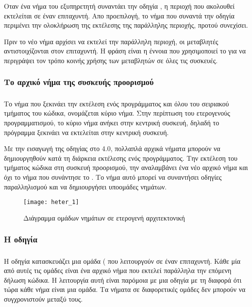 Οταν ένα νήμα του εξυπηρετητή συναντάει την οδηγία \emph{}, η περιοχή που ακολουθεί εκτελείται σε έναν επιταχυντή. Απο προεπιλογή, το νήμα που συναντά την οδηγία περιμένει την ολοκλήρωση της εκτέλεσης της παράλληλης περιοχής, προτού συνεχίσει.

Πριν το νέο νήμα αρχίσει να εκτελεί την παράλληλη περιοχή, οι μεταβλητές  \emph{} αντιστοιχίζονται στον επιταχυντή. Η φράση \emph{} είναι η έννοια που χρησιμοποιεί το \emph{} για να περιγράψει τον τρόπο κοινής χρήσης των μεταβλητών σε όλες τις συσκευές.



\subsubsection{Το αρχικό νήμα της συσκευής προορισμού}
\subparagraph{}
Το νήμα που ξεκινάει την εκτέλεση ενός προγράμματος και όλου του σειριακού τμήματος του κώδικα, ονομάζεται κύριο νήμα.
Στην περίπτωση του ετερογενούς προγραμματισμού, το κύριο νήμα ανήκει στην κεντρική συσκευή, δηλαδή το πρόγραμμα ξεκινάει να εκτελείται στην κεντρική συσκευή. 

Με την εισαγωγή της οδηγίας \emph{} στο \emph{} 4.0, πολλαπλά αρχικά νήματα μπορούν να δημιουργηθούν κατά τη διάρκεια εκτέλεσης ενός προγράμματος. Την εκτέλεση του τμήματος κώδικα στη συσκευή προορισμού, την αναλαμβάνει ένα νέο αρχικό νήμα και όχι το νήμα που συνάντησε το \emph{}. Το νήμα αυτό μπορεί να συναντήσει οδηγίες παραλληλισμού και να δημιουργήσει υποομάδες νημάτων.

\begin{figure}[h]
\texttt{[image: heter\_1]}
\centering
\captionsetup{justification=centering, singlelinecheck=false}
	\caption{Διάγραμμα ομάδων νημάτων σε ετερογενή αρχιτεκτονική}
\label{fig:heter_1}
\end{figure}

\subsubsection{H οδηγία \emph{}}
\subparagraph{}
Η οδηγία \emph{} κατασκευάζει μια ομάδα (\emph{} που λειτουργούν σε έναν επιταχυντή. Κάθε μία από αυτές τις ομάδες είναι ένα αρχικό νήμα που εκτελεί παράλληλα την επόμενη δήλωση κώδικα. Η λειτουργία αυτή είναι παρόμοια με μια οδηγία \emph{} με τη διαφορά ότι τώρα κάθε νήμα είναι μια ομάδα. Τα νήματα σε διαφορετικές ομάδες δεν μπορούν να συγχρονιστούν μεταξύ τους.

